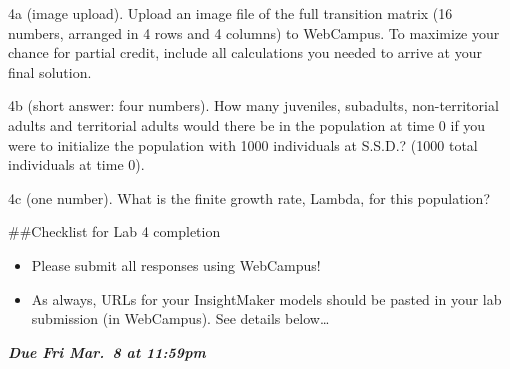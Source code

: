 \documentclass[
]{article}
\begin{document}
4a (image upload). Upload an image file of the full transition matrix
(16 numbers, arranged in 4 rows and 4 columns) to WebCampus. To maximize
your chance for partial credit, include all calculations you needed to
arrive at your final solution.

4b (short answer: four numbers). How many juveniles, subadults,
non-territorial adults and territorial adults would there be in the
population at time 0 if you were to initialize the population with 1000
individuals at S.S.D.? (1000 total individuals at time 0).

4c (one number). What is the finite growth rate, Lambda, for this
population?

\#\#Checklist for Lab 4 completion

\begin{itemize}
\item
  Please submit all responses using WebCampus!
\item
  As always, URLs for your InsightMaker models should be pasted in your
  lab submission (in WebCampus). See details below\ldots{}
\end{itemize}

\textbf{\emph{Due Fri Mar.~8 at 11:59pm}}
\end{document}
